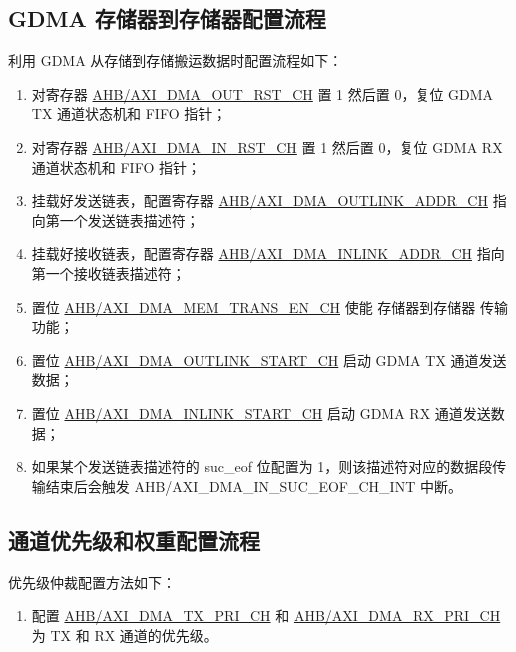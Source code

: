 \documentclass[main\_\_CN.tex]{subfiles}
\begin{document}
\subsection{GDMA 存储器到存储器配置流程}
利用 GDMA 从存储到存储搬运数据时配置流程如下：
\begin{enumerate}
    \item 对寄存器 \hyperref[fielddesc:AHBDMAOUTRSTCHN]{AHB/AXI\_DMA\_OUT\_RST\_CH} 置 1 然后置 0，复位 GDMA TX 通道状态机和 FIFO 指针；
    \item 对寄存器 \hyperref[fielddesc:AHBDMAINRSTCHN]{AHB/AXI\_DMA\_IN\_RST\_CH} 置 1 然后置 0，复位 GDMA RX 通道状态机和 FIFO 指针；
    \item 挂载好发送链表，配置寄存器 \hyperref[fielddesc:AHBDMAOUTLINKADDRCHN]{AHB/AXI\_DMA\_OUTLINK\_ADDR\_CH} 指向第一个发送链表描述符；
    \item 挂载好接收链表，配置寄存器 \hyperref[fielddesc:AHBDMAINLINKADDRCHN]{AHB/AXI\_DMA\_INLINK\_ADDR\_CH} 指向第一个接收链表描述符；
    \item 置位 \hyperref[fielddesc:AHBDMAMEMTRANSENCHN]{AHB/AXI\_DMA\_MEM\_TRANS\_EN\_CH} 使能 存储器到存储器 传输功能；
    \item 置位 \hyperref[fielddesc:AHBDMAOUTLINKSTARTCHN]{AHB/AXI\_DMA\_OUTLINK\_START\_CH} 启动 GDMA TX 通道发送数据；
    \item 置位 \hyperref[fielddesc:AHBDMAINLINKSTARTCHN]{AHB/AXI\_DMA\_INLINK\_START\_CH} 启动 GDMA RX 通道发送数据；
    \item 如果某个发送链表描述符的 suc\_eof 位配置为 1，则该描述符对应的数据段传输结束后会触发 AHB/AXI\_DMA\_IN\_SUC\_EOF\_CH\_INT 中断。
\end{enumerate}

\subsection{通道优先级和权重配置流程}

优先级仲裁配置方法如下：
\begin{enumerate}
\item  配置 \hyperref[fielddesc:AHBDMATXPRICHN]{AHB/AXI\_DMA\_TX\_PRI\_CH} 和 \hyperref[fielddesc:AHBDMARXPRICHN]{AHB/AXI\_DMA\_RX\_PRI\_CH} 为 TX 和 RX 通道的优先级。
\end{enumerate}
\end{document}
